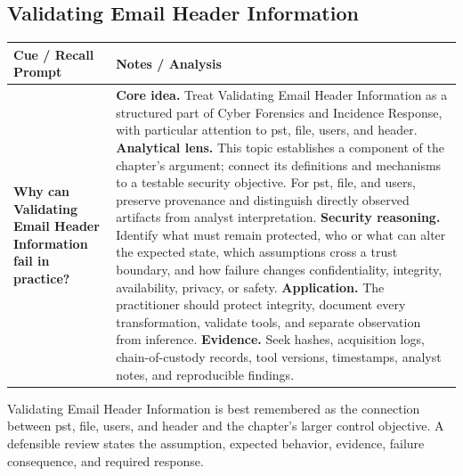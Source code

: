 \documentclass[11pt]{article}
\newcommand{\CornellHeader}{%
\rowcolor{Navy}\color{white}\bfseries Cue / Recall Prompt & \color{white}\bfseries Notes / Analysis\\\hline}
\newcommand{\CornellRow}[2]{%
\cellcolor{CueGray}\RaggedRight\textbf{#1} & \RaggedRight #2\\\hline}
\begin{document}
\subsection*{Validating Email Header Information}
\begin{longtable}{>{\RaggedRight\arraybackslash}p{}|>{\RaggedRight\arraybackslash}p{}}
\CornellHeader
\CornellRow{Why can Validating Email Header Information fail in practice?}{\textbf{Core idea.} Treat Validating Email Header Information as a structured part of Cyber Forensics and Incidence Response, with particular attention to pst, file, users, and header. \textbf{Analytical lens.} This topic establishes a component of the chapter's argument; connect its definitions and mechanisms to a testable security objective. For pst, file, and users, preserve provenance and distinguish directly observed artifacts from analyst interpretation. \textbf{Security reasoning.} Identify what must remain protected, who or what can alter the expected state, which assumptions cross a trust boundary, and how failure changes confidentiality, integrity, availability, privacy, or safety. \textbf{Application.} The practitioner should protect integrity, document every transformation, validate tools, and separate observation from inference. \textbf{Evidence.} Seek hashes, acquisition logs, chain-of-custody records, tool versions, timestamps, analyst notes, and reproducible findings.}
\end{longtable}
\begin{topicsummary}
Validating Email Header Information is best remembered as the connection between pst, file, users, and header and the chapter's larger control objective. A defensible review states the assumption, expected behavior, evidence, failure consequence, and required response.
\end{topicsummary}
\end{document}
